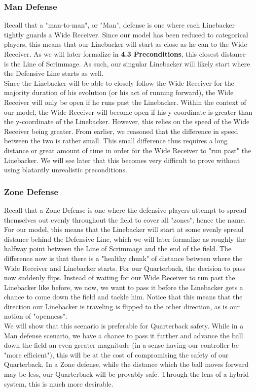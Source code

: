 \newpage

\subsubsection{Man Defense}

\quad Recall that a "man-to-man", or "Man", defense is one where each Linebacker tightly guards a Wide Receiver. Since our model has been reduced to categorical players, this means that our Linebacker will start as close as he can to the Wide Receiver. As we will later formalize in \textbf{4.3 Preconditions}, this closest distance is the Line of Scrimmage. As such, our singular Linebacker will likely start where the Defensive Line starts as well. \\

Since the Linebacker will be able to closely follow the Wide Receiver for the majority duration of his evolution (or his act of running forward), the Wide Receiver will only be open if he runs past the Linebacker. Within the context of our model, the Wide Receiver will become open if his y-coordinate is greater than the y-coordinate of the Linebacker. However, this relies on the speed of the Wide Receiver being greater. From earlier, we reasoned that the difference in speed between the two is rather small. This small difference thus requires a long distance or great amount of time in order for the Wide Receiver to "run past" the Linebacker. We will see later that this becomes very difficult to prove without using blatantly unrealistic preconditions.

\subsubsection{Zone Defense}

\quad Recall that a Zone Defense is one where the defensive players attempt to spread themselves out evenly throughout the field to cover all "zones", hence the name. For our model, this means that the Linebacker will start at some evenly spread distance behind the Defensive Line, which we will later formalize as roughly the halfway point between the Line of Scrimmage and the end of the field. The difference now is that there is a "healthy chunk" of distance between where the Wide Receiver and Linebacker starts. For our Quarterback, the decision to pass now suddenly flips. Instead of waiting for our Wide Receiver to run past the Linebacker like before, we now, we want to pass it before the Linebacker gets a chance to come down the field and tackle him. Notice that this means that the direction our Linebacker is traveling is flipped to the other direction, as is our notion of "openness". \\

We will show that this scenario is preferable for Quarterback safety. While in a Man defense scenario, we have a chance to pass it further and advance the ball down the field an even greater magnitude (in a sense having our controller be "more efficient"), this will be at the cost of compromising the safety of our Quarterback. In a Zone defense, while the distance which the ball moves forward may be less, our Quarterback will be provably safe. Through the lens of a hybrid system, this is much more desirable.
